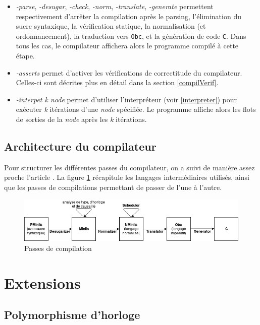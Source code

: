 \documentclass{article}
\begin{document}
\begin{itemize}
  \item \textit{-parse}, \textit{-desugar}, \textit{-check}, \textit{-norm}, \textit{-translate}, \textit{-generate} permettent respectivement d'arrêter la compilation après le parsing, l'élimination du sucre syntaxique, la vérification statique, la normalisation (et ordonnancement), la traduction vers \texttt{Obc}, et la génération de code \texttt{C}. Dans tous les cas, le compilateur affichera alors le programme compilé à cette étape.
  \item \textit{-asserts} permet d'activer les vérifications de correctitude du compilateur. Celles-ci sont décrites plus en détail dans la section \ref{compilVerif}.
  \item \textit{-interpet k node} permet d'utiliser l'interpréteur (voir \ref{interpreter}) pour exécuter \textit{k} itérations d'une \textit{node} spécifiée. Le programme affiche alors les flots de sorties de la \textit{node} après les \textit{k} itérations.
\end{itemize}

\subsection{Architecture du compilateur}

Pour structurer les différentes passes du compilateur, on a suivi de manière assez proche l'article \cite{Biernacki08}. La figure \ref{fig:passesCompil} récapitule les langages intermédiaires utilisés, ainsi que les passes de compilations permettant de passer de l'une à l'autre.

\begin{figure}[!ht]
  \centering
  \includegraphics[width=.7\paperwidth]{assets/chain.png}
  \caption{Passes de compilation}
  \label{fig:passesCompil}
\end{figure}

\section{Extensions}

\subsection{Polymorphisme d'horloge}
\end{document}
